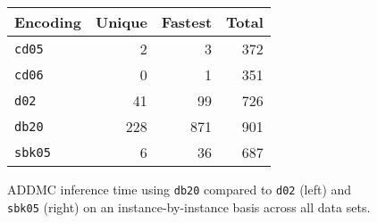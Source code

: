 \documentclass{article}
\theoremstyle{definition}
\theoremstyle{remark}
\begin{document}
{\begin{figure}
  \centering
  \begin{minipage}{0.59\textwidth}
    \centering
  \end{minipage}
  \begin{minipage}{0.39\textwidth}
    \centering
    \begin{tabular}{lrrr}
      \toprule
      Encoding & Unique & Fastest & Total \\
      \midrule
      \texttt{cd05} & 2 & 3 & 372 \\
      \texttt{cd06} & 0 & 1 & 351 \\
      \texttt{d02} & 41 & 99 & 726 \\
      \texttt{db20} & 228 & 871 & 901 \\
      \texttt{sbk05} & 6 & 36 & 687 \\
      \bottomrule
    \end{tabular}
  \end{minipage}
\end{figure}

\begin{figure}
  \centering
  \caption{ADDMC inference time using \texttt{db20} compared to \texttt{d02}
    (left) and \texttt{sbk05} (right) on an instance-by-instance basis across
    all data sets.}
\end{figure}

}
\end{document}
